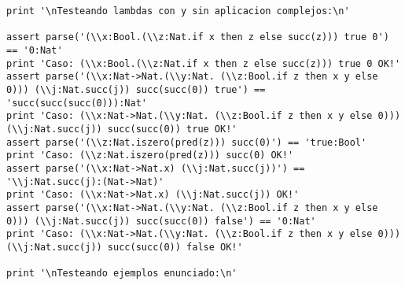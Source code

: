 \begin{verbatim}
print '\nTesteando lambdas con y sin aplicacion complejos:\n'

assert parse('(\\x:Bool.(\\z:Nat.if x then z else succ(z))) true 0') == '0:Nat'
print 'Caso: (\\x:Bool.(\\z:Nat.if x then z else succ(z))) true 0 OK!'
assert parse('(\\x:Nat->Nat.(\\y:Nat. (\\z:Bool.if z then x y else 0))) (\\j:Nat.succ(j)) succ(succ(0)) true') == 'succ(succ(succ(0))):Nat'
print 'Caso: (\\x:Nat->Nat.(\\y:Nat. (\\z:Bool.if z then x y else 0))) (\\j:Nat.succ(j)) succ(succ(0)) true OK!'
assert parse('(\\z:Nat.iszero(pred(z))) succ(0)') == 'true:Bool'
print 'Caso: (\\z:Nat.iszero(pred(z))) succ(0) OK!'
assert parse('(\\x:Nat->Nat.x) (\\j:Nat.succ(j))') == '\\j:Nat.succ(j):(Nat->Nat)'
print 'Caso: (\\x:Nat->Nat.x) (\\j:Nat.succ(j)) OK!'
assert parse('(\\x:Nat->Nat.(\\y:Nat. (\\z:Bool.if z then x y else 0))) (\\j:Nat.succ(j)) succ(succ(0)) false') == '0:Nat'
print 'Caso: (\\x:Nat->Nat.(\\y:Nat. (\\z:Bool.if z then x y else 0))) (\\j:Nat.succ(j)) succ(succ(0)) false OK!'

print '\nTesteando ejemplos enunciado:\n'


\end{verbatim}
